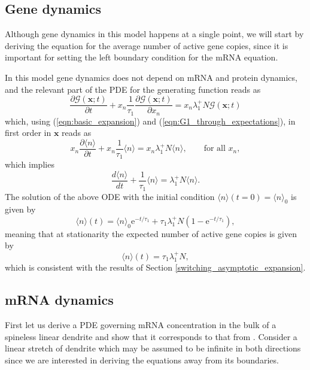\documentclass[a4paper, 11pt]{article}
\begin{document}
\subsection{Gene dynamics}
Although gene dynamics in this model happens at a single point, we will start by deriving the equation for the average number of active gene copies, since it is important for setting the left boundary condition for the mRNA equation.

In this model gene dynamics does not depend on mRNA and protein dynamics, and the relevant part of the PDE for the generating function reads as
\begin{equation*}
  \frac{\partial\mathcal G(\mathbf x;t)}{\partial t} + x_n\frac{1}{\tau_1}\frac{\partial\mathcal G(\mathbf x;t)}{\partial x_n} = x_n\lambda_1^+N\mathcal G(\mathbf x;t)
\end{equation*}
which, using (\ref{eqn:basic_expansion}) and (\ref{eqn:G1_through_expectations}), in first order in $\mathbf x$ reads as
\begin{equation*}
  x_n\frac{\partial\langle n\rangle}{\partial t} + x_n\frac{1}{\tau_1}\langle n\rangle = x_n\lambda_1^+N\langle n\rangle,\qquad \text{for all }x_n,
\end{equation*}
which implies
\begin{equation*}
  \frac{d\langle n\rangle}{dt} + \frac{1}{\tau_1}\langle n\rangle = \lambda_1^+N\langle n\rangle.
\end{equation*}
The solution of the above ODE with the initial condition $\langle n\rangle(t=0) = \langle n\rangle_0$ is given by
\begin{equation*}
  \langle n\rangle(t) = \langle n\rangle_0\mathrm e^{-t/\tau_1} + \tau_1\lambda_1^+N\left(1-\mathrm e^{-t/\tau_1}\right),
\end{equation*}
meaning that at stationarity the expected number of active gene copies is given by
\begin{equation}
  \langle n\rangle(t) = \tau_1\lambda_1^+N,
\end{equation} 
which is consistent with the results of Section \ref{switching_asymptotic_expansion}.

\subsection{mRNA dynamics}


First let us derive a PDE governing mRNA concentration in the bulk of a spineless linear dendrite and show that it corresponds to that from \cite{PMID:31350097}. Consider a linear stretch of dendrite which may be assumed to be infinite in both directions since we are interested in deriving the equations away from its boundaries.
\end{document}
